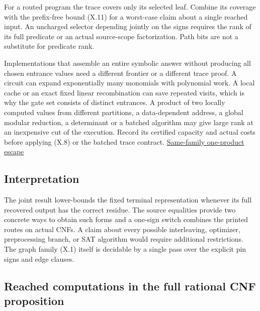 \documentclass[
  11pt,
]{article}
\begin{document}
For a routed program the trace covers only its selected leaf. Combine
its coverage with the prefix-free bound (X.11) for a worst-case claim
about a single reached input. An uncharged selector depending jointly on
the signs requires the rank of its full predicate or an actual
source-scope factorization. Path bits are not a substitute for predicate
rank.

Implementations that assemble an entire symbolic answer without
producing all chosen entrance values need a different frontier or a
different trace proof. A circuit can expand exponentially many monomials
with polynomial work. A local cache or an exact fixed linear
recombination can save repeated visits, which is why the gate set
consists of distinct entrances. A product of two locally computed values
from different partitions, a data-dependent address, a global modular
reduction, a determinant or a batched algorithm may give large rank at
an inexpensive cut of the execution. Record its certified capacity and
actual costs before applying (X.8) or the batched trace contract.
\href{https://github.com/dch-and-Elara/some-research-inspired-by-openais-eth-preprint/tree/main/rank-budget-barriers}{Same-family one-product
escape}

\subsection{Interpretation}\label{interpretation}

The joint result lower-bounds the fixed terminal representation whenever
its full recovered output has the correct residue. The source equalities
provide two concrete ways to obtain such forms and a one-sign switch
combines the printed routes on actual CNFs. A claim about every possible
interleaving, optimizer, preprocessing branch, or SAT algorithm would
require additional restrictions. The graph family (X.1) itself is
decidable by a single pass over the explicit pin signs and edge clauses.

\subsection{Reached computations in the full rational CNF
proposition}\label{reached-computations-in-the-full-rational-cnf-proposition}
\end{document}
